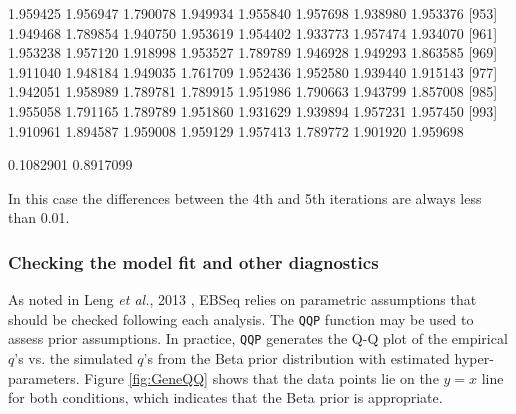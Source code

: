 \documentclass{article}
\begin{document}
\begin{Schunk}
\begin{Soutput}
 [945] 1.959425 1.956947 1.790078 1.949934 1.955840 1.957698 1.938980 1.953376
 [953] 1.949468 1.789854 1.940750 1.953619 1.954402 1.933773 1.957474 1.934070
 [961] 1.953238 1.957120 1.918998 1.953527 1.789789 1.946928 1.949293 1.863585
 [969] 1.911040 1.948184 1.949035 1.761709 1.952436 1.952580 1.939440 1.915143
 [977] 1.942051 1.958989 1.789781 1.789915 1.951986 1.790663 1.943799 1.857008
 [985] 1.955058 1.791165 1.789789 1.951860 1.931629 1.939894 1.957231 1.957450
 [993] 1.910961 1.894587 1.959008 1.959129 1.957413 1.789772 1.901920 1.959698
\end{Soutput}
\begin{Soutput}
[1] 0.1082901 0.8917099
\end{Soutput}
\end{Schunk}
In this case the differences between the 4th and 5th iterations are always less 
than 0.01.


\subsubsection{Checking the model fit and other diagnostics}
\label{sec:detailedgenedeplot}
As noted in Leng {\it et al.}, 2013 \cite{Leng13}, EBSeq relies on parametric assumptions that should
be checked following each analysis.
The \verb+QQP+ function may be used to assess prior assumptions. 
In practice, \verb+QQP+ generates the Q-Q plot of the empirical $q$'s 
vs. the simulated $q$'s from the Beta prior distribution with 
estimated hyper-parameters. Figure \ref{fig:GeneQQ} shows that the 
data points lie on the $y=x$ line for both conditions, which indicates 
that the Beta prior is appropriate.
\end{document}
